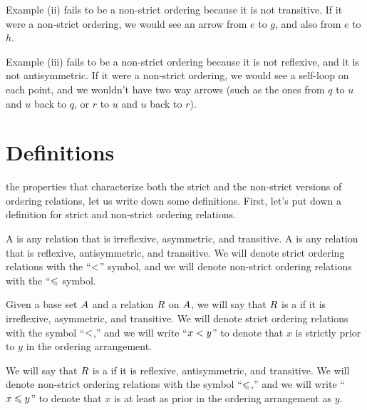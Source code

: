 \documentclass[../../../main.tex]{subfiles}
\begin{document}
Example (ii) fails to be a non-strict ordering because it is not transitive. If it were a non-strict ordering, we would see an arrow from $e$ to $g$, and also from $e$ to $h$.

Example (iii) fails to be a non-strict ordering because it is not reflexive, and it is not antisymmetric. If it were a non-strict ordering, we would see a self-loop on each point, and we wouldn't have two way arrows (such as the ones from $q$ to $u$ and $u$ back to $q$, or $r$ to $u$ and $u$ back to $r$).


\section{Definitions}
\label{sec:ordered-sets-definitions}

 the properties that characterize both the strict and the non-strict versions of ordering relations, let us write down some definitions. First, let's put down a definition for strict and non-strict ordering relations. 

\begin{terminology}
  A  is any relation that is irreflexive, asymmetric, and transitive. A  is any relation that is reflexive, antisymmetric, and transitive. We will denote strict ordering relations with the ``$\strictorder/$'' symbol, and we will denote non-strict ordering relations with the ``$\order/$ symbol.
\end{terminology}%
%
\begin{fdefinition}
  \label{def:ordering-relations}
  Given a base set $A$ and a relation $R$ on $A$, we will say that $R$ is a  if it is irreflexive, asymmetric, and transitive. We will denote strict ordering relations with the symbol ``$\strictorder/$,'' and we will write ``$x \strictorder/ y$'' to denote that $x$ is strictly prior to $y$ in the ordering arrangement.
  
  We will say that $R$ is a  if it is reflexive, antisymmetric, and transitive. We will denote non-strict ordering relations with the symbol ``$\order/$,'' and we will write ``$x \order/ y$'' to denote that $x$ is at least as prior in the ordering arrangement as $y$.
\end{fdefinition}
\end{document}
